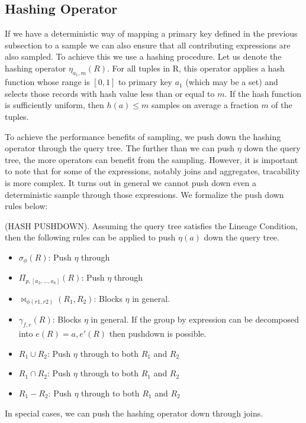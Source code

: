 \subsection{Hashing Operator}
If we have a deterministic way of mapping a primary key defined in the previous subsection to a sample we can also ensure that all contributing expressions are also sampled. 
To achieve this we use a hashing procedure.
Let us denote the hashing operator $\eta_{a_1, m}(R)$. 
For all tuples in R, this operator applies a hash function whose range is $[0,1]$ to primary key $a_1$ (which may be a set) and selects those records with hash value less than or equal to $m$.
If the hash function is sufficiently uniform, then $h(a) \le m$ samples on average a fraction $m$ of the tuples.

To achieve the performance benefits of sampling, we push down the hashing operator through the query tree.
The further than we can push $\eta$ down the query tree, the more operators can benefit from the sampling.
However, it is important to note that for some of the expressions, notably joins and aggregates, tracability is more complex.
It turns out in general we cannot push down even a deterministic sample through those expressions.
We formalize the push down rules below:
\begin{proposition}
(HASH PUSHDOWN). Assuming the query tree satisfies the Lineage Condition, then the following rules can be applied to push $\eta(a)$ down the query tree. 
\begin{itemize}\vspace{-.45em}
\item $\sigma_{\phi}(R)$: Push $\eta$ through \vspace{-.45em}
\item $\Pi_{p,[a_2,...,a_k]}(R)$: Push $\eta $ through \vspace{-.45em}
\item $\bowtie_{\phi (r1,r2)}(R_1,R_2)$: Blocks $\eta $ in general. 
\item $\gamma_{f,e}(R)$: Blocks $\eta$ in general. If the group by expression can be decomposed into $e(R) = a, e'(R)$ then pushdown is possible.\vspace{-.45em}
\item $R_1 \cup R_2$: Push $\eta $ through to both $R_1$ and $R_2$
\item $R_1 \cap R_2$: Push $\eta $ through to both $R_1$ and $R_2$
\item $R_1 - R_2$: Push $\eta $ through to both $R_1$ and $R_2$
\end{itemize}
\end{proposition}
In special cases, we can push the hashing operator down through joins. 

